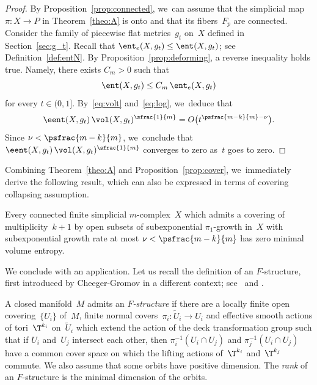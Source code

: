 \begin{proof}
By Proposition~\ref{prop:connected}, we~can assume that the simplicial map $\pi:X \to P$ in Theorem~\ref{theo:A} is onto and that its fibers~$F_p$ are connected.
Consider the family of piecewise flat metrics~$g_t$ on~$X$ defined in Section~\ref{sec:g_t}.
Recall that $\ent_e(X,g_t) \leq \ent(X,g_t)$; see Definition~\ref{def:entN}.
By Proposition~\ref{prop:deforming}, a reverse inequality holds true.
Namely, there exists $C_m >0$ such that
\begin{equation*} %
\ent(X,g_t) \leq C_m \, \ent_e(X,g_t)
\end{equation*}
for every $t \in (0,1]$.
By~\eqref{eq:volt} and~\eqref{eq:log}, we~deduce that
\[
\eent(X,g_t) \, \vol(X,g_t)^\sfrac{1}{m} = O \bigl(t^{\psfrac{m-k}{m} - \nu} \bigr).
\]
Since $\nu < \psfrac{m-k}{m}$, we~conclude that $\eent(X,g_t) \, \vol(X,g_t)^\sfrac{1}{m}$ converges to zero as~$t$ goes to zero.
\end{proof}

Combining Theorem~\ref{theo:A} and Proposition~\ref{prop:cover}, we~immediately derive the following result, which can also be expressed in terms of covering collapsing assumption.

\begin{corollary}\label{coro:collapsing}
Every connected finite simplicial $m$\nobreakdash-complex~$X$ which admits a covering of multiplicity~$k+1$ by open subsets of subexponential $\pi_1$-growth in~$X$ with subexponential growth rate at most $\nu < \psfrac{m-k}{m}$ has zero minimal volume entropy.
\end{corollary}

We conclude with an application.
Let us recall the definition of an $F$-structure, first introduced by Cheeger-Gromov in a different context; see~\cite{ChG} and \cite{ChGbis}.

\begin{definition} \label{def:F-structure}
A closed manifold~$M$ admits an \emph{$F$-structure} if there are a locally finite open covering~$\{U_i\}$ of~$M$, finite normal covers~$\pi_i:\tilde{U}_i \to U_i$ and effective smooth actions of tori~$\T^{k_i}$ on~$\tilde{U}_i$ which extend the action of the deck transformation group such that if $U_i$ and~$U_j$ intersect each other, then $\pi_i^{-1}(U_i \cap U_j)$ and $\pi_j^{-1}(U_i \cap U_j)$ have a common cover space on which the lifting actions of~$\T^{k_i}$ and~$\T^{k_j}$ commute.
We also assume that some orbits have positive dimension.
The \emph{rank} of an $F$-structure is the minimal dimension of the orbits.
\end{definition}

